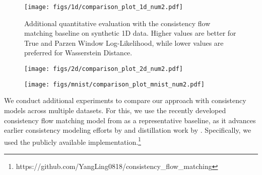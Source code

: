 \begin{figure}[t]
    \centering
    \texttt{[image: figs/1d/comparison\_plot\_1d\_num2.pdf]} \\
    \vspace{-1em}
    \caption{Additional quantitative evaluation with the consistency flow matching baseline on synthetic 1D data. Higher values are better for True and Parzen Window Log-Likelihood, while lower values are preferred for Wasserstein Distance.}
    \label{app:fig:1d_quant_result}
\end{figure}

\begin{figure}[t]
    \centering
    \begin{minipage}{0.28\textwidth} %
        \label{app:fig:2d_quant_result}
    \end{minipage}%
    \hfill
    \begin{minipage}{0.7\textwidth} %
        \centering
        \texttt{[image: figs/2d/comparison\_plot\_2d\_num2.pdf]} %
    \end{minipage}
\end{figure}

\begin{figure}[t]
    \centering
    \begin{minipage}{0.5\textwidth} %
        \label{app:fig:mnist_quant}
    \end{minipage}%
    \hfill
    \begin{minipage}{0.5\textwidth} %
        \centering
        \texttt{[image: figs/mnist/comparison\_plot\_mnist\_num2.pdf]} %
    \end{minipage}
\end{figure}

We conduct additional experiments to compare our approach with  consistency models across multiple datasets. For this, we use the recently developed consistency flow matching model from \citet{yang2024consistency} as a representative baseline, as it advances earlier consistency modeling efforts by \citet{song2023consistency, kimconsistency} and distillation work by \citet{nguyenbellman}. Specifically, we used the publicly available implementation.\footnote{https://github.com/YangLing0818/consistency\_flow\_matching}


